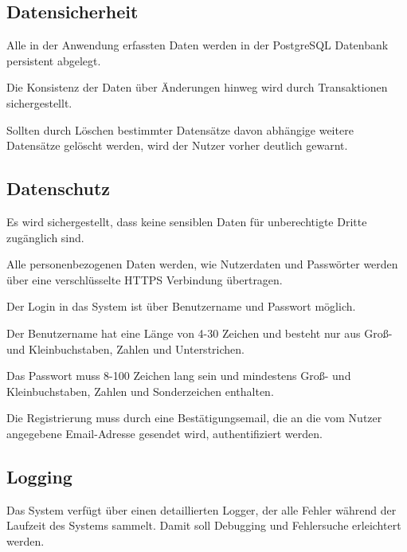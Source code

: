 \subsection{Datensicherheit}

\begin{description}
	 Alle in der Anwendung erfassten Daten werden in der PostgreSQL Datenbank persistent abgelegt.

	 Die Konsistenz der Daten über Änderungen hinweg wird durch Transaktionen sichergestellt.

	 Sollten durch Löschen bestimmter Datensätze davon abhängige weitere Datensätze gelöscht werden, wird der Nutzer vorher deutlich gewarnt.
\end{description}

\subsection{Datenschutz}

\begin{description}
	 Es wird sichergestellt, dass keine sensiblen Daten für unberechtigte Dritte zugänglich sind.

	 Alle personenbezogenen Daten werden, wie Nutzerdaten und Passwörter werden über eine verschlüsselte HTTPS Verbindung übertragen.

	 Der Login in das System ist über Benutzername und Passwort möglich.

	 Der Benutzername hat eine Länge von 4-30 Zeichen und besteht nur aus Groß- und Kleinbuchstaben, Zahlen und Unterstrichen.

	 Das Passwort muss 8-100 Zeichen lang sein und mindestens Groß- und Kleinbuchstaben, Zahlen und Sonderzeichen enthalten.

	 Die Registrierung muss durch eine Bestätigungsemail, die an die vom Nutzer angegebene Email-Adresse gesendet wird, authentifiziert werden.
\end{description}

\subsection{Logging}

\begin{description}
	 Das System verfügt über einen detaillierten Logger, der alle Fehler während der Laufzeit des Systems sammelt. Damit soll Debugging und Fehlersuche erleichtert werden.
\end{description}

